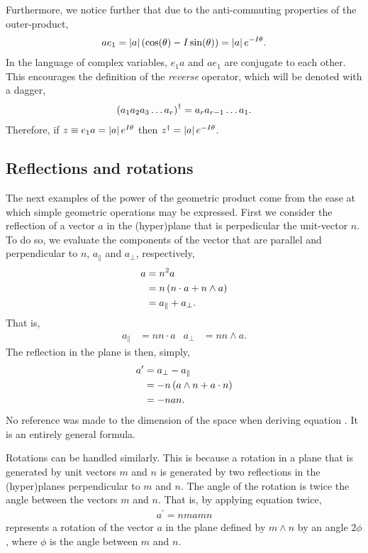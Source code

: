 Furthermore, we notice further that due to the anti-commuting properties of the outer-product,
\begin{align}
  a e_1  =   \left| a \right|\left( \cos(\theta) - I \sin(\theta) \right) =  \left| a \right| e^{-I\theta}.
\label{eqn:deMorgan_conj}
\end{align}
In the language of complex variables, $e_1 a$ and $a e_1$ are conjugate to each other.
This encourages the definition of the {\em reverse} operator, which will be denoted with a dagger,
\begin{align}
  \left( a_1 a_2 a_3 \ldots a_r \right)^\dagger = a_r a_{r-1} \ldots a_1.
\end{align}
Therefore, if $z \equiv e_1 a = \left| a \right| e^{I\theta}$ then $z^\dagger = \left| a \right| e^{-I\theta}$.

\subsection{Reflections and rotations}

The next examples of the power of the geometric product come from the ease at which simple geometric operations may be expressed.
First we consider the reflection of a vector $a$ in the (hyper)plane that is perpedicular the unit-vector $n$.
To do so, we evaluate the components of the vector that are parallel and perpendicular to $n$, $a_{\parallel}$ and $a_\perp$, respectively,
\begin{align}
a &= n^2 a \\
  &= n \left( n\cdot a + n\wedge a \right)\\
  &= a_\parallel + a_\perp.
\end{align}
That is,
\begin{align}
  a_\parallel &= n n\cdot a & a_\perp &= n n\wedge a.
\end{align}
The reflection in the plane is then, simply,
\begin{align}
  a^\prime &= a_\perp - a_\parallel \\
  &= -n \left( a \wedge n + a\cdot n \right)\\
  &= -nan.
\label{eqn:reflection}
\end{align}
No reference was made to the dimension of the space when deriving equation .
It is an entirely general formula.

Rotations can be handled similarly.
This is because a rotation in a plane that is generated by unit vectors $m$ and $n$ is generated 
by two reflections in the (hyper)planes perpendicular to $m$ and $n$.
The angle of the rotation is twice the angle between the vectors $m$ and $n$.
That is, by applying equation  twice,
\begin{align}
a^\prime = nmamn
\end{align}
represents a rotation of the vector $a$ in the plane defined by $m\wedge n$ by an angle $2\phi$, 
where $\phi$ is the angle between $m$ and $n$.

